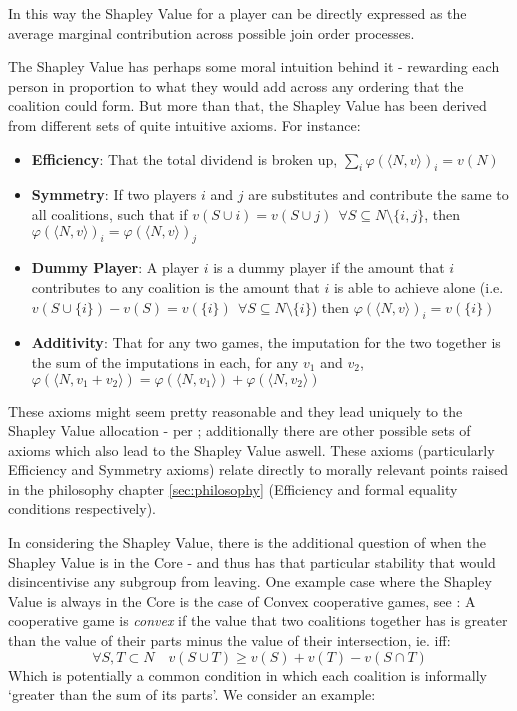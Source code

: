 In this way the Shapley Value for a player can be directly expressed as the average marginal contribution across possible join order processes.

The Shapley Value has perhaps some moral intuition behind it - rewarding each person in proportion to what they would add across any ordering that the coalition could form.
But more than that, the Shapley Value has been derived from different sets of quite intuitive axioms.
For instance:

\begin{itemize}
\item	\textbf{Efficiency}: That the total dividend is broken up, $\sum_i\varphi(\langle N,v\rangle)_i = v(N)$
\item	\textbf{Symmetry}: If two players $i$ and $j$ are substitutes and contribute the same to all coalitions, such that if $v(S\cup i)=v(S\cup j)~~\forall S\subseteq N\setminus\{i,j\}$, then $\varphi(\langle N,v\rangle)_i = \varphi(\langle N,v\rangle)_j$
\item	\textbf{Dummy Player}: A player $i$ is a dummy player if the amount that $i$ contributes to any coalition is the amount that $i$ is able to achieve alone (i.e.\ $v(S\cup \{i\})-v(S)=v(\{i\})~~\forall S\subseteq N\setminus\{i\}$) then $\varphi(\langle N,v\rangle)_i=v(\{i\})$
\item	\textbf{Additivity}: That for any two games, the imputation for the two together is the sum of the imputations in each, for any $v_1$ and $v_2$, $\varphi(\langle N,v_1+v_2\rangle)=\varphi(\langle N,v_1 \rangle) + \varphi(\langle N,v_2\rangle)$
\end{itemize}

These axioms might seem pretty reasonable and they lead uniquely to the Shapley Value allocation - per \cite{Shapley1953a}; additionally there are other possible sets of axioms which also lead to the Shapley Value aswell.
These axioms (particularly Efficiency and Symmetry axioms) relate directly to morally relevant points raised in the philosophy chapter \ref{sec:philosophy} (Efficiency and formal equality conditions respectively).

In considering the Shapley Value, there is the additional question of when the Shapley Value is in the Core - and thus has that particular stability that would disincentivise any subgroup from leaving.
One example case where the Shapley Value is always in the Core is the case of Convex cooperative games, see \cite[Chapter 6]{RePEc:cup:cbooks:9781107691322}:
A cooperative game is \textit{convex} if the value that two coalitions together has is greater than the value of their parts minus the value of their intersection, ie. iff:
\begin{equation}
    \forall S,T\subset N \quad v(S\cup T) \ge v(S)+v(T)-v(S\cap T)
\end{equation}
Which is potentially a common condition in which each coalition is informally `greater than the sum of its parts'.
We consider an example:

